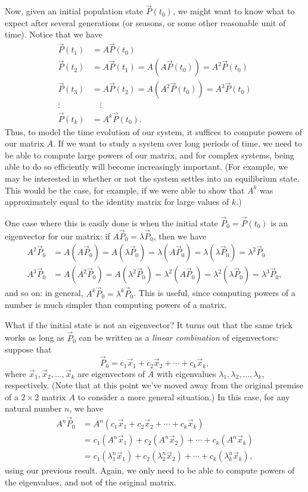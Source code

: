 Now, given an initial population state $\vec{P}(t_0)$, we might want to know what to expect after several generations (or seasons, or some other reasonable unit of time). Notice that we have
\begin{align*}
 \vec{P}(t_1) & = A\vec{P}(t_0)\\
 \vec{P}(t_2) & = A\vec{P}(t_1) = A(A\vec{P}(t_0)) = A^2\vec{P}(t_0)\\
 \vec{P}(t_3) & = A\vec{P}(t_2) = A(A^2\vec{P}(t_0)) = A^3\vec{P}(t_0)\\
 \vdots \quad & \quad \vdots\\
 \vec{P}(t_k) & = A^k\vec{P}(t_0).
\end{align*}
Thus, to model the time evolution of our system, it suffices to compute powers of our matrix $A$. If we want to study a system over long periods of time, we need to be able to compute large powers of our matrix, and for complex systems, being able to do so efficiently will become increasingly important. (For example, we may be interested in whether or not the system settles into an equilibrium state. This would be the case, for example, if we were able to show that $A^k$ was approximately equal to the identity matrix for large values of $k$.)

One case where this is easily done is when the initial state $\vec{P}_0=\vec{P}(t_0)$ is an eigenvector for our matrix: if $A\vec{P}_0 = \lambda\vec{P}_0$, then we have
\begin{align*}
 A^2\vec{P}_0 &= A(A\vec{P}_0) = A(\lambda \vec{P}_0) = \lambda (A\vec{P}_0) = \lambda(\lambda \vec{P}_0) = \lambda^2\vec{P}_0\\
 A^3\vec{P}_0 &= A(A^2\vec{P}_0) = A(\lambda^2\vec{P}_0) = \lambda^2 (A\vec{P}_0) = \lambda^2(\lambda\vec{P}_0) = \lambda^3\vec{P}_0,
\end{align*}
and so on: in general, $A^k\vec{P}_0 = \lambda^k\vec{P}_0$. This is useful, since computing powers of a number is much simpler than computing powers of a matrix.

What if the initial state is not an eigenvector? It turns out that the same trick works as long as $\vec{P}_0$ can be written as a \textit{linear combination} of eigenvectors: suppose that
\[
 \vec{P}_0 = c_1\vec{x}_1 + c_2\vec{x}_2 + \cdots + c_k\vec{x}_k,
\]
where $\vec{x}_1, \vec{x}_2, \ldots, \vec{x}_k$ are eigenvectors of $A$ with eigenvalues $\lambda_1, \lambda_2, \ldots, \lambda_k$, respectively. (Note that at this point we've moved away from the original premise of a $2\times 2$ matrix $A$ to consider a more general situation.) In this case, for any natural number $n$, we have
\begin{align*}
 A^n\vec{P}_0 &= A^n(c_1\vec{x}_1 + c_2\vec{x}_2 + \cdots + c_k\vec{x}_k)\\
 & = c_1(A^n\vec{x}_1) + c_2(A^n\vec{x}_2) + \cdots + c_k(A^n\vec{x}_k)\\
 & = c_1(\lambda_1^n\vec{x}_1) + c_2(\lambda_2^n\vec{x}_2) + \cdots + c_k(\lambda_k^n\vec{x}_k),
\end{align*}
using our previous result. Again, we only need to be able to compute powers of the eigenvalues, and not of the original matrix.

